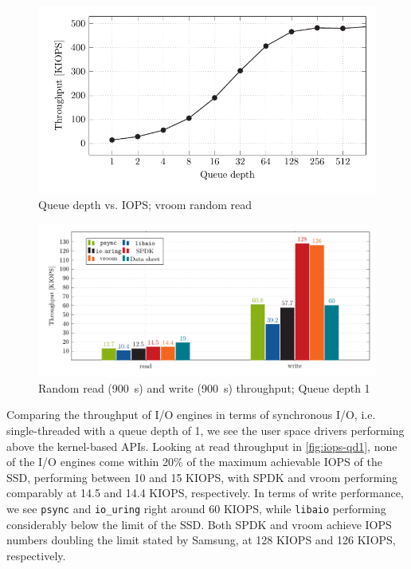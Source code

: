 \begin{figure}[H]
  \centering
  \includegraphics[width=\textwidth]{figures/vroom-iops-qd}
  \caption{Queue depth vs. IOPS; vroom random read}
  \label{fig:vroom-iops-qd}
\end{figure}


\begin{figure}[H]
  \centering
    \includegraphics[width=\textwidth]{figures/iops-qd1-ybar}
    \caption{Random read (\qty{900}{\second}) and write (\qty{900}{\second}) throughput; Queue depth 1}
    \label{fig:iops-qd1}
\end{figure}

Comparing the throughput of I/O engines in terms of synchronous I/O, i.e. single-threaded with a queue depth of 1, we see the user space drivers performing above the kernel-based APIs. Looking at read throughput in \autoref{fig:iops-qd1}, none of the I/O engines come within 20\% of the maximum achievable IOPS of the SSD, performing between 10 and 15 KIOPS, with SPDK and vroom performing comparably at 14.5 and 14.4 KIOPS, respectively. In terms of write performance, we see \texttt{psync} and \texttt{io\_uring} right around 60 KIOPS, while \texttt{libaio} performing considerably below the limit of the SSD. Both SPDK and vroom achieve IOPS numbers doubling the limit stated by Samsung, at 128 KIOPS and 126 KIOPS, respectively.

